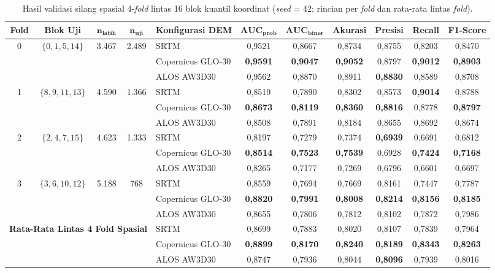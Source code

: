 \documentclass[12pt]{article}
\begin{document}
\begin{table}[ht]
\small
\centering
\caption{Hasil validasi silang spasial 4-\textit{fold} lintas 16 blok kuantil koordinat (\textit{seed} = 42; rincian per \textit{fold} dan rata-rata lintas \textit{fold}).}
\label{tab:spatial-cv}
\begin{adjustbox}{max width=\textwidth}
\begin{tabular}{c c c c l cccccc}
\toprule
\textbf{Fold} & \textbf{Blok Uji} & $\boldsymbol{n_{\text{latih}}}$ & $\boldsymbol{n_{\text{uji}}}$ & \textbf{Konfigurasi DEM} & $\textbf{AUC}_{\textbf{prob}}$ & $\textbf{AUC}_{\textbf{biner}}$ & \textbf{Akurasi} & \textbf{Presisi} & \textbf{Recall} & \textbf{F1-Score} \\
\midrule
0 & $\{0, 1, 5, 14\}$ & 3.467 & 2.489 & SRTM & 0,9521 & 0,8667 & 0,8734 & 0,8755 & 0,8203 & 0,8470 \\
  & & & & Copernicus GLO-30 & \textbf{0,9591} & \textbf{0,9047} & \textbf{0,9052} & 0,8797 & \textbf{0,9012} & \textbf{0,8903} \\
  & & & & ALOS AW3D30 & 0,9562 & 0,8870 & 0,8911 & \textbf{0,8830} & 0,8589 & 0,8708 \\
\midrule
1 & $\{8, 9, 11, 13\}$ & 4.590 & 1.366 & SRTM & 0,8519 & 0,7890 & 0,8302 & 0,8573 & \textbf{0,9014} & 0,8788 \\
  & & & & Copernicus GLO-30 & \textbf{0,8673} & \textbf{0,8119} & \textbf{0,8360} & \textbf{0,8816} & 0,8778 & \textbf{0,8797} \\
  & & & & ALOS AW3D30 & 0,8508 & 0,7891 & 0,8184 & 0,8655 & 0,8692 & 0,8674 \\
\midrule
2 & $\{2, 4, 7, 15\}$ & 4.623 & 1.333 & SRTM & 0,8197 & 0,7279 & 0,7374 & \textbf{0,6939} & 0,6691 & 0,6812 \\
  & & & & Copernicus GLO-30 & \textbf{0,8514} & \textbf{0,7523} & \textbf{0,7539} & 0,6928 & \textbf{0,7424} & \textbf{0,7168} \\
  & & & & ALOS AW3D30 & 0,8265 & 0,7177 & 0,7269 & 0,6796 & 0,6601 & 0,6697 \\
\midrule
3 & $\{3, 6, 10, 12\}$ & 5.188 & 768 & SRTM & 0,8559 & 0,7694 & 0,7669 & 0,8161 & 0,7447 & 0,7787 \\
  & & & & Copernicus GLO-30 & \textbf{0,8820} & \textbf{0,7991} & \textbf{0,8008} & \textbf{0,8214} & \textbf{0,8156} & \textbf{0,8185} \\
  & & & & ALOS AW3D30 & 0,8655 & 0,7806 & 0,7812 & 0,8102 & 0,7872 & 0,7986 \\
\midrule
\multicolumn{4}{l}{\textbf{Rata-Rata Lintas 4 Fold Spasial}} & SRTM & 0,8699 & 0,7883 & 0,8020 & 0,8107 & 0,7839 & 0,7964 \\
\multicolumn{4}{l}{} & Copernicus GLO-30 & \textbf{0,8899} & \textbf{0,8170} & \textbf{0,8240} & \textbf{0,8189} & \textbf{0,8343} & \textbf{0,8263} \\
\multicolumn{4}{l}{} & ALOS AW3D30 & 0,8747 & 0,7936 & 0,8044 & \textbf{0,8096} & 0,7939 & 0,8016 \\
\bottomrule
\end{tabular}
\end{adjustbox}
\end{table}
\end{document}

